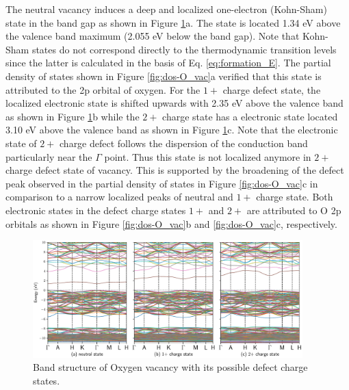 The neutral  vacancy induces a deep and localized one-electron (Kohn-Sham) state in the band gap as shown in Figure \ref{fig:band-O_vac}a. The state is located 1.34 eV above the valence band maximum (2.055 eV below the band gap). Note that Kohn-Sham states do not correspond directly to the thermodynamic transition levels since the latter is calculated in the basis of Eq. \eqref{eq:formation_E}. The partial density of states shown in Figure \ref{fig:dos-O_vac}a verified that this state is attributed to the 2p orbital of oxygen. For the $1+$ charge defect state, the localized electronic state is shifted upwards with 2.35 eV above the valence band as shown in Figure  \ref{fig:band-O_vac}b  while the $2+$ charge state has a electronic state located 3.10 eV above the valence band as shown in Figure \ref{fig:band-O_vac}c. Note that the electronic state of $2+$ charge defect follows the dispersion of the conduction band particularly near the $\Gamma$ point. Thus this state is not localized anymore in $2+$ charge defect state of  vacancy. This is supported by the broadening of the defect peak observed in the partial density of states in Figure \ref{fig:dos-O_vac}c in comparison to a narrow localized peaks of neutral and $1+$ charge state. Both electronic states in the defect charge  states $1+$ and $2+$ are attributed to O 2p orbitals as shown in Figure \ref{fig:dos-O_vac}b and \ref{fig:dos-O_vac}c, respectively.

\begin{figure}[tbph!]
	\centering
	\includegraphics[width=0.93\textwidth]{"images/rnd/O_vac-band"}
	\caption[Band structure of Oxygen vacancy with its possible defect charge states]{Band structure of Oxygen vacancy with its possible defect charge states. }
	\label{fig:band-O_vac}
\end{figure}

